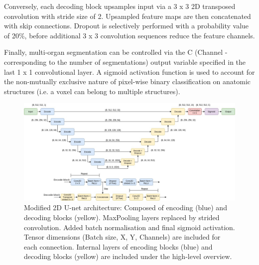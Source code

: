 Conversely, each decoding block upsamples input via a 3 x 3 2D transposed convolution with stride size of 2. Upsampled feature maps are then concatenated with skip connections. Dropout is selectively performed with a probability value of 20\%, before additional 3 x 3 convolution sequences reduce the feature channels.

Finally, multi-organ segmentation can be controlled via the C (Channel - corresponding to the number of segmentations) output variable
specified in the last 1 x 1 convolutional layer. A sigmoid activation function is used to account for the non-mutually exclusive nature
of pixel-wise binary classification on anatomic structures (i.e. a voxel can belong to multiple structures).

\begin{figure}[!htb]
	\begin{center}
		\hspace*{-1.3cm}\includegraphics[width=1.15\textwidth]{figures/model_diagram}
		\caption{Modified 2D U-net architecture: Composed of encoding (blue) and decoding blocks (yellow). MaxPooling layers replaced by strided convolution. Added batch normalisation and final sigmoid activation. Tensor dimensions (Batch size, X, Y, Channels) are included for each connection. Internal layers of encoding blocks (blue) and decoding blocks (yellow) are included under the high-level overview.}
		\label{fig:model}
	\end{center}
\end{figure}

